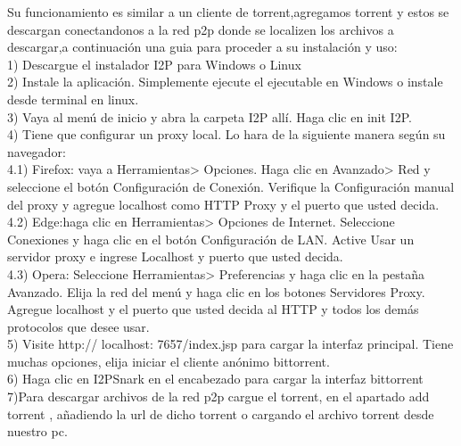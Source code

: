 \documentclass[12]{article}
\begin{document}
Su funcionamiento es similar a un cliente de torrent,agregamos torrent y estos se descargan conectandonos a la red p2p donde se localizen los archivos a descargar,a continuación 
una guia para proceder a su instalación y uso:
\\

1) Descargue el instalador I2P para Windows o Linux
\\

2) Instale la aplicación. Simplemente ejecute el ejecutable en Windows o instale desde terminal en linux.
\\

3) Vaya al menú de inicio y abra la carpeta I2P allí. Haga clic en init I2P.
\\

4) Tiene que configurar un proxy local. Lo hara de la siguiente manera según su navegador:
\\

4.1) Firefox: vaya a Herramientas> Opciones. Haga clic en Avanzado> Red y seleccione el botón Configuración de Conexión. Verifique la Configuración manual del proxy y agregue localhost como HTTP Proxy y el puerto que usted decida.
\\

4.2) Edge:haga clic en Herramientas> Opciones de Internet. Seleccione Conexiones  y haga clic en el botón Configuración de LAN. Active Usar un servidor proxy e ingrese Localhost y puerto que usted decida.
\\

4.3) Opera: Seleccione Herramientas> Preferencias y haga clic en la pestaña Avanzado. Elija la red del menú y haga clic en los botones Servidores Proxy. Agregue localhost y el puerto que usted decida al HTTP y todos los demás protocolos que desee usar.
\\

5) Visite http:// localhost: 7657/index.jsp para cargar la interfaz principal. Tiene muchas opciones, elija iniciar el cliente anónimo bittorrent.
\\

6) Haga clic en I2PSnark en el encabezado para cargar la interfaz bittorrent
\\

7)Para descargar archivos de la red p2p  cargue el torrent, en el apartado add torrent , añadiendo la url de dicho torrent o cargando el archivo torrent desde nuestro pc.
\\
\end{document}
